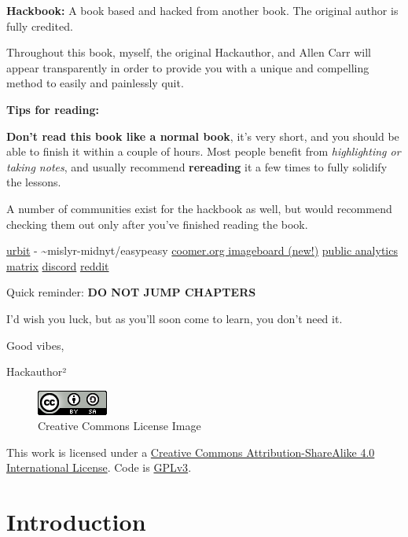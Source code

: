 \documentclass[
]{book}
\begin{document}
{\textbf{Hackbook:} A book based and hacked from another book. The original author is fully credited. }

Throughout this book, myself, the original Hackauthor, and Allen Carr will appear transparently in order to provide you with a unique and compelling method to easily and painlessly quit.

{\textbf{Tips for reading:}}

\textbf{Don't read this book like a normal book}, it's very short, and you should be able to finish it within a couple of hours. Most people benefit from \emph{highlighting or taking notes}, and usually recommend \textbf{rereading} it a few times to fully solidify the lessons.

A number of communities exist for the hackbook as well, but would recommend checking them out only after you've finished reading the book.

\href{https://urbit.org}{urbit} - \textasciitilde mislyr-midnyt/easypeasy \textbar{} \href{https://coomer.org}{coomer.org imageboard (new!)} \textbar{} \href{https://plausible.io/easypeasymethod.org}{public analytics} \textbar{} \href{https://matrix.to/\#/!xmJZznbJXuwzEGSEti:matrix.org?via=matrix.org}{matrix} \textbar{} \href{https://discord.com/invite/bCXEnf9}{discord} \textbar{} \href{https://reddit.com/r/pmohackbook}{reddit}

Quick reminder: {\textbf{DO NOT JUMP CHAPTERS}}

I'd wish you luck, but as you'll soon come to learn, you don't need it.

Good vibes,

Hackauthor²

\begin{figure}
\centering
\includegraphics[width=0.91667in,height=0.32292in]{images/cc.png}
\caption{Creative Commons License Image}
\end{figure}

This work is licensed under a \href{https://creativecommons.org/licenses/by-sa/4.0/}{Creative Commons Attribution-ShareAlike 4.0 International License}. Code is \href{https://gitlab.com/snuggy/easypeasy/-/blob/master/LICENSE}{GPLv3}.

\hypertarget{introduction}{%
\chapter{Introduction}\label{introduction}}
\end{document}
